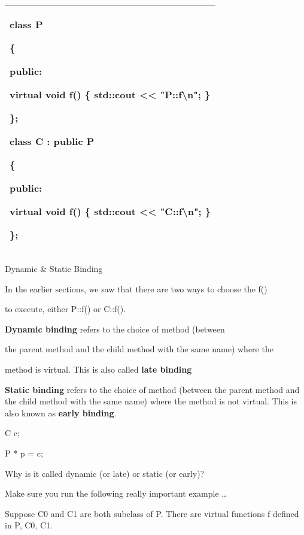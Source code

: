 \documentclass[
]{article}
\begin{document}
\begin{longtable}[]{@{}l@{}}
\toprule
\endhead
\begin{minipage}[t]{0.97\columnwidth}\raggedright
class P

\{

public:

virtual void f() \{ std::cout \textless\textless{}
"P::f\textbackslash n"; \}

\};

class C : public P

\{

public:

\textbf{ virtual }void f() \{ std::cout \textless\textless{}
"C::f\textbackslash n"; \}

\};\strut
\end{minipage}\tabularnewline
\bottomrule
\end{longtable}

Dynamic \& Static Binding

In the earlier sections, we saw that there are two ways to choose the
f()

to execute, either P::f() or C::f().

\textbf{Dynamic binding }refers to the choice of method (between

the parent method and the child method with the same name) where the

method is virtual. This is also called \textbf{late binding}

\textbf{Static binding }refers to the choice of method (between the
parent method and the child method with the same name) where the method
is not virtual. This is also known as \textbf{early binding}.

C c;

P * p = c;

Why is it called dynamic (or late) or static (or early)?

Make sure you run the following really important example \ldots{}

Suppose C0 and C1 are both subclass of P. There are virtual functions f
defined in P, C0, C1.
\end{document}

